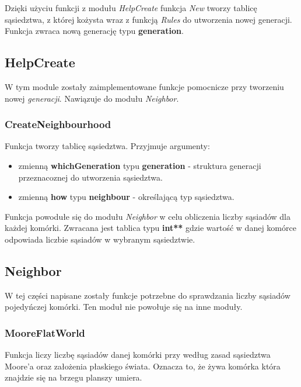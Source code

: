 \documentclass[a4paper]{article}
\begin{document}
\quad Dzi\k{e}ki u\.zyciu funkcji z modu\l{}u \textit{HelpCreate} funkcja \textit{New} tworzy tablic\k{e} s\k{a}siedztwa, z kt\'orej ko\.zysta wraz z funkcj\k{a} \textit{Rules} do utworzenia nowej generacji. 
Funkcja zwraca now\k{a} generacj\k{e} typu \textbf{generation}.


\subsection{HelpCreate}

\quad W tym module zosta\l{}y zaimplementowane funkcje pomocnicze przy tworzeniu nowej \textit{generacji}.
Nawi\k{a}zuje do modu\l{}u \textit{Neighbor}.

\subsubsection{CreateNeighbourhood}

\quad Funkcja tworzy tablic\k{e} s\k{a}siedztwa. 
Przyjmuje argumenty:

\begin{itemize}
        \item zmienn\k{a} \textbf{whichGeneration} typu \textbf{generation} - struktura generacji przeznacoznej do utworzenia s\k{a}siedztwa.
        \item zmienn\k{a} \textbf{how} typu \textbf{neighbour} - okre\'slaj\k{a}c\k{a} typ s\k{a}siedztwa.
\end{itemize}

\quad Funkcja powodu\l{}e si\k{e} do modu\l{}u \textit{Neighbor} w celu obliczenia liczby s\k{a}siad\'ow dla ka\.zdej kom\'orki.
Zwracana jest tablica typu \textbf{int**} gdzie warto\'s\'c w danej kom\'orce odpowiada liczbie s\k{a}siad\'ow w wybranym s\k{a}siedztwie.

\subsection{Neighbor}

\quad W tej cz\k{e}\'sci napisane zosta\l{}y funkcje potrzebne do sprawdzania liczby s\k{a}siad\'ow pojedy\'nczej kom\'orki.
Ten modu\l{} nie powo\l{}uje si\k{e} na inne modu\l{}y.

\subsubsection{MooreFlatWorld}

\quad Funkcja liczy liczb\k{e} s\k{a}siad\'ow danej kom\'orki przy wed\l{}ug zasad s\k{a}siedztwa Moore'a oraz za\l{}o\.zenia p\l{}askiego \'swiata. 
Oznacza to, \.ze \.zywa kom\'orka kt\'ora znajdzie si\k{e} na brzegu planszy umiera.
\end{document}
